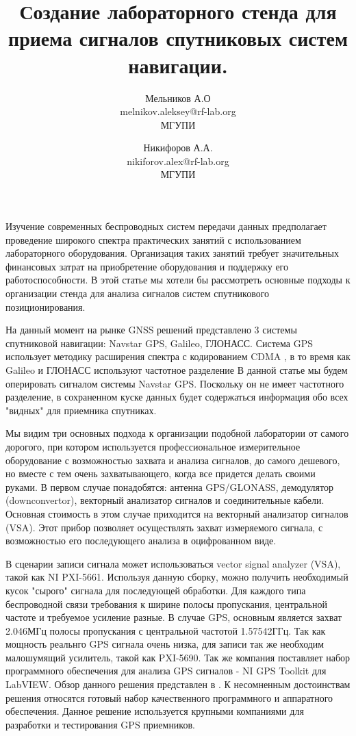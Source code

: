 \documentclass[a4paper,12pt]{article}
\numberwithin{table}{section}
\begin{document}
\title{Создание лабораторного стенда для приема сигналов спутниковых систем навигации.}
\author{Мельников А.О\\ melnikov.aleksey@rf-lab.org\\ МГУПИ \and Никифоров А.А.\\nikiforov.alex@rf-lab.org\\ МГУПИ}

\maketitle

Изучение современных беспроводных систем передачи данных предполагает проведение широкого спектра практических занятий с использованием лабораторного
оборудования.
Организация таких занятий требует значительных финансовых затрат на приобретение оборудования и поддержку его работоспособности. В этой статье мы хотели бы
рассмотреть основные подходы к организации стенда для анализа сигналов систем спутникового позиционирования.

На данный момент на рынке GNSS решений представлено 3 системы спутниковой навигации: Navstar GPS, Galileo, ГЛОНАСС. Система GPS использует методику
расширения спектра с кодированием CDMA \cite{gpsuserequipment}, в то время как Galileo и ГЛОНАСС используют частотное разделение \cite{galileo}
В данной статье мы будем оперировать
сигналом системы Navstar GPS. Поскольку он не имеет частотного разделение, в сохраненном куске данных будет содержаться информация обо всех "видных"
для приемника спутниках.
 
Мы видим три основных подхода к организации подобной лаборатории от самого дорогого, при котором используется профессиональное измерительное
оборудование с возможностью
захвата и анализа сигналов, до самого дешевого, но вместе с тем очень захватывающего, когда все придется делать своими руками.
В первом случае понадобятся: антенна GPS/GLONASS, демодулятор (downconvertor),
векторный анализатор сигналов и соединительные кабели. Основная стоимость в этом случае приходится на векторный анализатор сигналов (VSA).
Этот прибор позволяет осуществлять захват измеряемого сигнала, с возможностью его последующего анализа в оцифрованном виде.

В сценарии записи сигнала может использоваться vector signal analyzer (VSA), такой как NI PXI-5661.
Используя данную сборку, можно получить необходимый кусок "сырого" сигнала для последующей обработки.
Для каждого типа беспроводной связи требования к ширине полосы пропускания, центральной частоте и требуемое усиление разные. В
случае GPS, основным является захват 2.046МГц полосы пропускания с центральной частотой 1.57542ГГц.
Так как мощность реальнго GPS сигнала очень низка, для записи так же необходим малошумящий усилитель, такой как PXI-5690.
Так же компания поставляет набор программного обеспечения для анализа  GPS сигналов - NI GPS Toolkit для LabVIEW.
Обзор данного решения представлен в \cite{ni-vsa}.
К несомненным достоинствам решения относятся готовый набор качественного программного и аппаратного обеспечения.
Данное решение используется крупными компаниями для разработки и тестирования GPS приемников.
 
\end{document}
